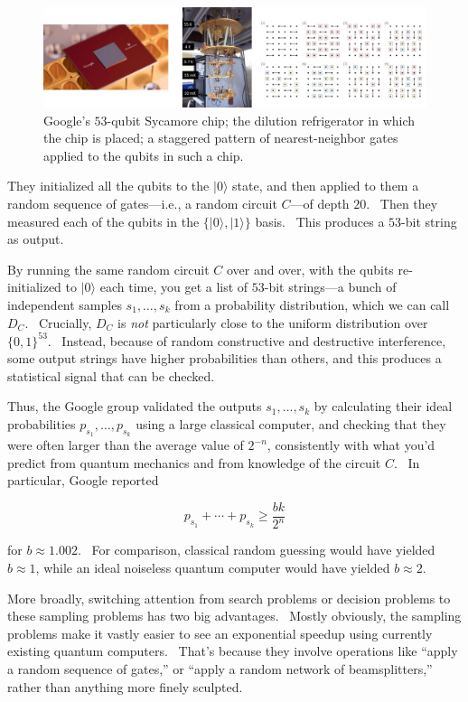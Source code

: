 \documentclass[11pt]{article}
\begin{document}
\begin{figure}
\includegraphics[width=6.5in]{google.jpg}
\caption{Google's $53$-qubit Sycamore chip; the dilution refrigerator in which the chip is placed; a staggered pattern of nearest-neighbor gates applied to the qubits in such a chip.}
\label{google}
\end{figure}

They initialized all the qubits to the $|0\rangle$ state, and then applied to them a random sequence of gates---i.e., a random circuit $C$---of depth $20$. \ Then they measured each of the qubits in the $\{ |0\rangle, |1\rangle \}$ basis. \ This produces a $53$-bit string as output.

By running the same random circuit $C$ over and over, with the qubits re-initialized to $|0\rangle$ each time, you get a list of $53$-bit strings---a bunch of independent samples $s_1,\ldots,s_k$ from a probability distribution, which we can call $D_C$. \ Crucially, $D_C$ is \emph{not} particularly close to the uniform distribution over $\{0,1\}^{53}$. \ Instead, because of random constructive and destructive interference, some output strings have higher probabilities than others, and this produces a statistical signal that can be checked.

Thus, the Google group validated the outputs $s_1,\ldots,s_k$ by calculating their ideal probabilities $p_{s_1},\ldots,p_{s_k}$ using a large classical computer, and checking that they were often larger than the average value of $2^{-n}$, consistently with what you'd predict from quantum mechanics and from knowledge of the circuit $C$. \ In particular, Google reported

$$ p_{s_1} + \cdots + p_{s_k} \ge \frac{bk}{2^n}$$

\noindent for $b\approx 1.002$. \ For comparison, classical random guessing would have yielded $b\approx 1$, while an ideal noiseless quantum computer would have yielded $b\approx 2$.

More broadly, switching attention from search problems or decision problems to these sampling problems has two big advantages. \ Mostly obviously, the sampling problems make it vastly easier to see an exponential speedup using currently existing quantum computers. \ That's because they involve operations like ``apply a random sequence of gates,'' or ``apply a random network of beamsplitters,'' rather than anything more finely sculpted.
\end{document}
